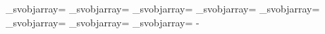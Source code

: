{{{{            %
            \advance\indexb\cntDeltaA
            \fontdimen\indexb\_svobjarray=\onesp %
            \advance\indexb\cntDeltaB
            \fontdimen\indexb\_svobjarray=\onesp %
            \advance\indexb\cntDeltaC
            \fontdimen\indexb\_svobjarray=\onesp %
            \advance\indexb\cntDeltaD
            \fontdimen\indexb\_svobjarray=\onesp %
            \advance\indexb\cntDeltaE
            \fontdimen\indexb\_svobjarray=\onesp %
            \advance\indexb\cntDeltaF
            \fontdimen\indexb\_svobjarray=\onesp %
            \advance\indexb\cntDeltaG
            \fontdimen\indexb\_svobjarray=\onesp %
            \advance\indexb\cntDeltaH
            \fontdimen\indexb\_svobjarray=\onesp %
           }%
         }%
        \multiply\cnta\@m
        \advance\cnte-\cnta %
        \cnta\cnte
        \divide\cnta\wheelcogcount
        }}
